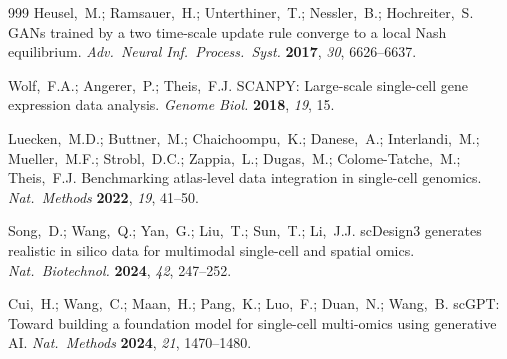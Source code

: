 \begin{thebibliography}{999}
Heusel,~M.; Ramsauer,~H.; Unterthiner,~T.; Nessler,~B.; Hochreiter,~S. GANs trained by a two time-scale update rule converge to a local Nash equilibrium. {\em Adv.\ Neural Inf.\ Process.\ Syst.} {\bf 2017}, {\em 30}, 6626--6637.

Wolf,~F.A.; Angerer,~P.; Theis,~F.J. SCANPY: Large-scale single-cell gene expression data analysis. {\em Genome Biol.} {\bf 2018}, {\em 19}, 15.

Luecken,~M.D.; Buttner,~M.; Chaichoompu,~K.; Danese,~A.; Interlandi,~M.; Mueller,~M.F.; Strobl,~D.C.; Zappia,~L.; Dugas,~M.; Colome-Tatche,~M.; Theis,~F.J. Benchmarking atlas-level data integration in single-cell genomics. {\em Nat.\ Methods} {\bf 2022}, {\em 19}, 41--50.

Song,~D.; Wang,~Q.; Yan,~G.; Liu,~T.; Sun,~T.; Li,~J.J. scDesign3 generates realistic in silico data for multimodal single-cell and spatial omics. {\em Nat.\ Biotechnol.} {\bf 2024}, {\em 42}, 247--252.

Cui,~H.; Wang,~C.; Maan,~H.; Pang,~K.; Luo,~F.; Duan,~N.; Wang,~B. scGPT: Toward building a foundation model for single-cell multi-omics using generative AI. {\em Nat.\ Methods} {\bf 2024}, {\em 21}, 1470--1480.

\end{thebibliography}